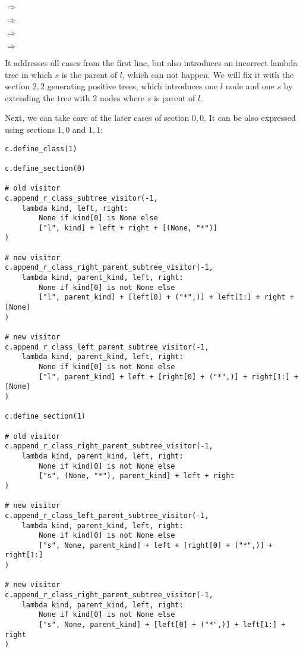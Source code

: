 \documentclass[final]{article}
\theoremstyle{definition}
\theoremstyle{remark}
\newcommand{\includeinlinesvg}[2]{\begin{minipage}{#1\textwidth}\end{minipage}}
\begin{document}
\includeinlinesvg{.24}{lambda__trees_100__0_base}\(\Rightarrow\)\includeinlinesvg{.24}{lambda__trees_100__0}%
\includeinlinesvg{.24}{lambda__trees_100__1_base}\(\Rightarrow\)\includeinlinesvg{.24}{lambda__trees_100__1}%

\includeinlinesvg{.24}{lambda__trees_100__2_base}\(\Rightarrow\)\includeinlinesvg{.24}{lambda__trees_100__2}%
\includeinlinesvg{.24}{lambda__trees_100__3_base}\(\Rightarrow\)\includeinlinesvg{.24}{lambda__trees_100__3}%

It addresses all cases from the first line, but also introduces an incorrect lambda tree in which \(s\) is the parent of \(l\), which can not happen. We will fix it with the section \(2,2\) generating positive trees, which introduces one \(l\) node and one \(s\) by extending the tree with \(2\) nodes where \(s\) is parent of \(l\).

Next, we can take care of the later cases of section \(0, 0\). It can be also expressed using sections \(1, 0\) and \(1, 1\):

\begin{lstlisting}
c.define_class(1)

c.define_section(0)

# old visitor
c.append_r_class_subtree_visitor(-1,
    lambda kind, left, right:
        None if kind[0] is None else
        ["l", kind] + left + right + [(None, "*")]
)

# new visitor
c.append_r_class_right_parent_subtree_visitor(-1,
    lambda kind, parent_kind, left, right:
        None if kind[0] is not None else
        ["l", parent_kind] + [left[0] + ("*",)] + left[1:] + right + [None]
)

# new visitor
c.append_r_class_left_parent_subtree_visitor(-1,
    lambda kind, parent_kind, left, right:
        None if kind[0] is not None else
        ["l", parent_kind] + left + [right[0] + ("*",)] + right[1:] + [None]
)

c.define_section(1)

# old visitor
c.append_r_class_right_parent_subtree_visitor(-1,
    lambda kind, parent_kind, left, right:
        None if kind[0] is not None else
        ["s", (None, "*"), parent_kind] + left + right
)

# new visitor
c.append_r_class_left_parent_subtree_visitor(-1,
    lambda kind, parent_kind, left, right:
        None if kind[0] is not None else
        ["s", None, parent_kind] + left + [right[0] + ("*",)] + right[1:]
)

# new visitor
c.append_r_class_right_parent_subtree_visitor(-1,
    lambda kind, parent_kind, left, right:
        None if kind[0] is not None else
        ["s", None, parent_kind] + [left[0] + ("*",)] + left[1:] + right
)
\end{lstlisting}
\end{document}
